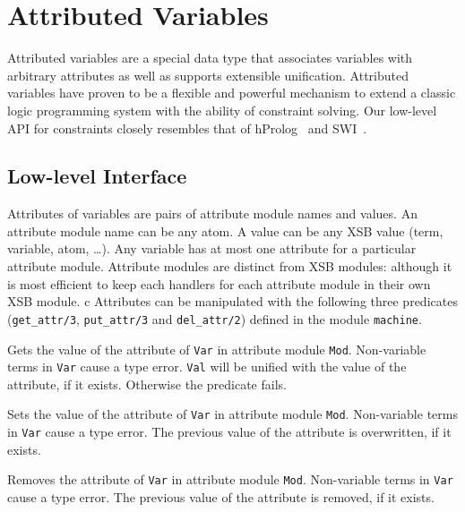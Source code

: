 \section{Attributed Variables} \label{sec:attributed-variables}

%
Attributed variables are a special data type that associates variables
with arbitrary attributes as well as supports extensible unification.
Attributed variables have proven to be a flexible and powerful
mechanism to extend a classic logic programming system with the
ability of constraint solving.  Our low-level API for constraints
closely resembles that of hProlog~\cite{hprolog} and
SWI~\cite{SWI-manual}.

\subsection{Low-level Interface}
%
Attributes of variables are pairs of attribute module names and
values.  An attribute module name can be any atom.  A value can be any
XSB value (term, variable, atom, \ldots). Any variable has at most one
attribute for a particular attribute module.  Attribute modules are
distinct from XSB modules: although it is most efficient to keep each
handlers for each attribute module in their own XSB module.
c
Attributes can be manipulated with the following three predicates
(\texttt{get\_attr/3}, \texttt{put\_attr/3} and \texttt{del\_attr/2})
defined in the module \texttt{machine}.

\begin{description}
%
Gets the value of the attribute of \texttt{Var} in attribute module
\texttt{Mod}. Non-variable terms in \texttt{Var} cause a type
error. \texttt{Val} will be unified with the value of the attribute,
if it exists. Otherwise the predicate fails.

%
Sets the value of the attribute of \texttt{Var} in attribute module
\texttt{Mod}. Non-variable terms in \texttt{Var} cause a type
error. The previous value of the attribute is overwritten, if it
exists.

%
Removes the attribute of \texttt{Var} in attribute module
\texttt{Mod}. Non-variable terms in \texttt{Var} cause a type
error. The previous value of the attribute is removed, if it exists.
\end{description}

